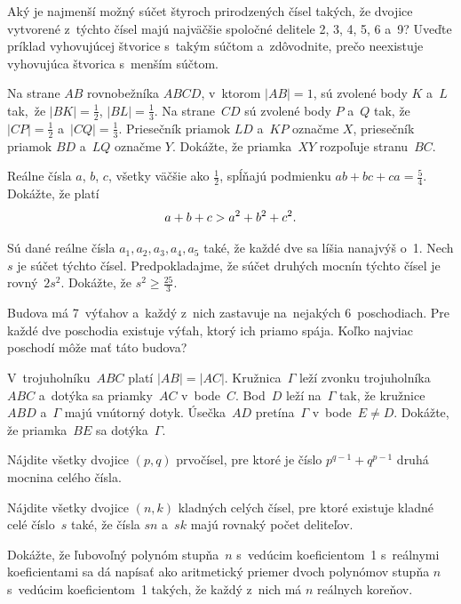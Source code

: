 {%
Aký je najmenší možný súčet štyroch prirodzených čísel takých, že
dvojice vytvorené z~týchto čísel majú najväčšie
spoločné delitele 2, 3, 4, 5, 6 a~9?
Uveďte príklad vyhovujúcej štvorice s~takým súčtom a~zdôvodnite, prečo
neexistuje vyhovujúca štvorica s~menším súčtom.}

{%
Na strane $AB$ rovnobežníka $ABCD$, v~ktorom $|AB|=1$, sú
zvolené body $K$ a~$L$ tak,~že $|BK|=\frac12$,
$|BL|=\frac13$. Na strane~$CD$ sú
zvolené body $P$ a~$Q$ tak, že ${|CP|=\frac12}$ a~$|CQ|=\frac13$.
Priesečník priamok $LD$ a~$KP$ označme $X$, priesečník
priamok $BD$ a~$LQ$ označme $Y$.
Dokážte, že priamka~$XY$ rozpoľuje stranu~$BC$.}

{%
Reálne čísla $a$, $b$, $c$, všetky väčšie ako $\frac12$, spĺňajú
podmienku $ab+bc+ca=\frac54$. Dokážte, že platí
$$
\belowdisplayshortskip0pt
a+b+c>a^2+b^2+c^2.
$$}

{%
 Sú dané reálne čísla $a_1,a_2,a_3,a_4,a_5$ také, že každé dve sa líšia nanajvýš o~1. Nech $s$ je súčet týchto čísel. Predpokladajme, že súčet druhých mocnín týchto čísel je rovný~$2s^2$. Dokážte, že $s^2 \ge \frac{25}{3}$.
}

{%
 Budova má 7~výťahov a~každý z~nich zastavuje na~nejakých 6~poschodiach. Pre každé dve poschodia existuje výťah, ktorý ich priamo spája. Koľko najviac poschodí môže mať táto budova?
}

{%
 V~trojuholníku~$ABC$ platí $|AB|=|AC|$. Kružnica~$\Gamma$ leží zvonku trojuholníka $ABC$ a~dotýka sa priamky~$AC$ v~bode~$C$. Bod~$D$ leží na~$\Gamma$ tak, že kružnice $ABD$ a~$\Gamma$ majú vnútorný dotyk. Úsečka~$AD$ pretína~$\Gamma$ v~bode~$E \ne D$. Dokážte, že priamka~$BE$ sa dotýka~$\Gamma$.}

{%
 Nájdite všetky dvojice $(p,q)$ prvočísel, pre ktoré je číslo $p^{q-1}+q^{p-1}$ druhá mocnina celého čísla.
}

{%
 Nájdite všetky dvojice $(n,k)$ kladných celých čísel, pre ktoré existuje kladné celé číslo~$s$ také, že čísla $sn$ a~$sk$ majú rovnaký počet deliteľov.
}

{%
 Dokážte, že ľubovoľný polynóm stupňa~$n$ s~vedúcim koeficientom~1 s~reálnymi koeficientami sa dá napísať ako aritmetický priemer dvoch polynómov stupňa $n$ s~vedúcim koeficientom~1 takých, že každý z~nich má $n$ reálnych koreňov.
~}

